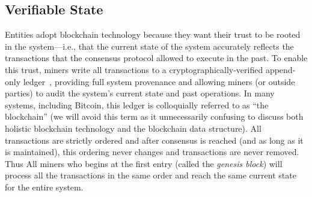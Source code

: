 \subsection{Verifiable State}

Entities adopt blockchain technology because they want their trust to be rooted in the system---i.e., that the current state of the system accurately reflects the transactions that the consensus protocol allowed to execute in the past.
To enable this trust, miners write all transactions to a cryptographically-verified append-only ledger~\cite{tamassia2003authenticated}, providing full system provenance and allowing miners (or outside parties) to audit the system's current state and past operations.
In many systems, including Bitcoin, this ledger is colloquially referred to as ``the blockchain'' (we will avoid this term as it unnecessarily confusing to discuss both holistic blockchain technology and the blockchain data structure). All transactions are strictly ordered and after consensus is reached (and as long as it is maintained), this ordering never changes and transactions are never removed. Thus All miners who begins at the first entry (called the \emph{genesis block}) will process all the transactions in the same order and reach the same current state for the entire system.




